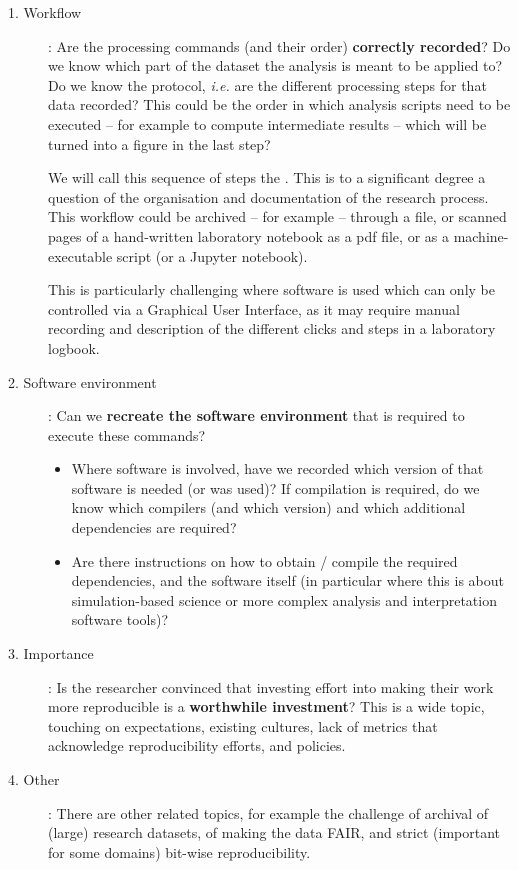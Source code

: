 \begin{description}
\item[1. Workflow]: Are the processing commands (and their order)
\textbf{correctly recorded}? Do we know which part of the dataset the analysis is meant to be applied to? Do we know the protocol, \emph{i.e.} are the different processing steps for that data recorded? This could be the order in which analysis scripts need to be executed -- for example to compute intermediate results -- which will be turned into a figure in the last step?

We will call this sequence of steps the . This is to a significant degree a question of the organisation and documentation of the research process. This workflow could be archived -- for example -- through a  file, or scanned pages of a hand-written laboratory notebook as a pdf file, or as a
machine-executable script (or a Jupyter notebook).

This is particularly challenging where software is used which can only be
controlled via a Graphical User Interface, as it may require manual recording
and description of the different clicks and steps in a laboratory logbook.

\item[2. Software environment]: Can we \textbf{recreate the software environment} that is required to execute these commands?
\begin{itemize}
\item Where software is involved, have we recorded which version of that software is needed (or was used)? If compilation is required, do we know which compilers (and which version) and which additional dependencies are required?
\item Are there instructions on how to obtain / compile the required dependencies,
and the software itself (in particular where this is about simulation-based
science or more complex analysis and interpretation software tools)?
\end{itemize}

\item[3. Importance]: Is the researcher convinced that investing effort into making
their work more reproducible is a \textbf{worthwhile investment}? This is a wide topic,
touching on expectations, existing cultures, lack of metrics that acknowledge
reproducibility efforts, and policies.

\item[4. Other]: There are other related topics, for example the challenge of
archival of (large) research datasets, of making the data FAIR, and strict
(important for some domains) bit-wise reproducibility.
\end{description}

